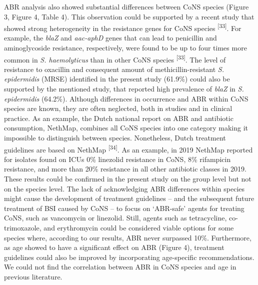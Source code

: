 \documentclass[
]{book}
\begin{document}
ABR analysis also showed substantial differences between CoNS species (Figure 3, Figure 4, Table 4). This observation could be supported by a recent study that showed strong heterogeneity in the resistance genes for CoNS species \textsuperscript{{[}33{]}}. For example, the \emph{blaZ} and \emph{aac-aphD} genes that can lead to penicillin and aminoglycoside resistance, respectively, were found to be up to four times more common in \emph{S. haemolyticus} than in other CoNS species \textsuperscript{{[}33{]}}. The level of resistance to oxacillin and consequent amount of methicillin-resistant \emph{S. epidermidis} (MRSE) identified in the present study (61.9\%) could also be supported by the mentioned study, that reported high prevalence of \emph{blaZ} in \emph{S. epidermidis} (64.2\%). Although differences in occurrence and ABR within CoNS species are known, they are often neglected, both in studies and in clinical practice. As an example, the Dutch national report on ABR and antibiotic consumption, NethMap, combines all CoNS species into one category making it impossible to distinguish between species. Nonetheless, Dutch treatment guidelines are based on NethMap \textsuperscript{{[}34{]}}. As an example, in 2019 NethMap reported for isolates found on ICUs 0\% linezolid resistance in CoNS, 8\% rifampicin resistance, and more than 20\% resistance in all other antibiotic classes in 2019. These results could be confirmed in the present study on the group level but not on the species level. The lack of acknowledging ABR differences within species might cause the development of treatment guidelines -- and the subsequent future treatment of BSI caused by CoNS -- to focus on `ABR-safe' agents for treating CoNS, such as vancomycin or linezolid. Still, agents such as tetracycline, co-trimoxazole, and erythromycin could be considered viable options for some species where, according to our results, ABR never surpassed 10\%. Furthermore, as age showed to have a significant effect on ABR (Figure 4), treatment guidelines could also be improved by incorporating age-specific recommendations. We could not find the correlation between ABR in CoNS species and age in previous literature.
\end{document}
